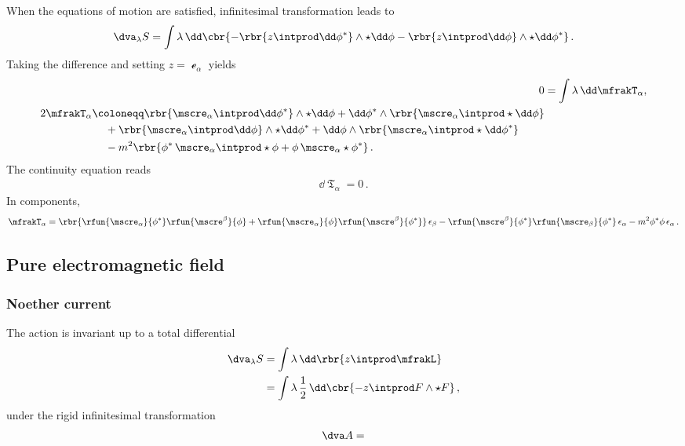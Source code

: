 \documentclass[a4paper]{article}
\begin{document}
When the equations of motion are satisfied, infinitesimal 
transformation leads to
\begin{align}
\dva_{\lambda} S = \int \lambda\,\dd\cbr{
	-\rbr{z\intprod\dd\phi^*}\wedge\star\dd\phi
	-\rbr{z\intprod\dd\phi}\wedge\star\dd\phi^*}\,.
\end{align}
Taking the difference and setting $z = \mscre_{\alpha}$ yields
\begin{align}
0 &= \int \lambda\,\dd \mfrakT_{\alpha}, \\
\begin{split}
2 \mfrakT_{\alpha} &\coloneqq
\rbr{\mscre_{\alpha}\intprod\dd\phi^*}\wedge\star\dd\phi +
\dd\phi^*\wedge\rbr{\mscre_{\alpha}\intprod\star\dd\phi}
\\
&\quad\,+
\rbr{\mscre_{\alpha}\intprod\dd\phi}\wedge\star\dd\phi^* +
\dd\phi\wedge\rbr{\mscre_{\alpha}\intprod\star\dd\phi^*}
\\
&\quad\,-
m^2\rbr{\phi^*\,\mscre_{\alpha}\intprod\star\phi +
	\phi\,\mscre_{\alpha}\star\phi^*}\,.
\end{split}
\end{align}
The continuity equation reads
\begin{align}
\dd \mfrakT_{\alpha} = 0\,.
\end{align}
In components,
\begin{align}
\mfrakT_{\alpha} =
\rbr{\rfun{\mscre_{\alpha}}{\phi^*} \rfun{\mscre^{\beta}}{\phi}+
	\rfun{\mscre_{\alpha}}{\phi} \rfun{\mscre^{\beta}}{\phi^*}}\,
		\epsilon_{\beta} - 
\rfun{\mscre^{\beta}}{\phi^*} \rfun{\mscre_{\beta}}{\phi^*}\,
	\epsilon_{\alpha}
- m^2 \phi^* \phi\, \epsilon_{\alpha}\,.
\end{align}

\subsection{Pure electromagnetic field}

\subsubsection{Noether current}
The action is invariant up to a total differential
\begin{align}
\dva_{\lambda} S &= \int \lambda\,\dd\rbr{z \intprod \mfrakL}
\nonumber \\
&= \int \lambda\,\frac{1}{2}\,\dd\cbr{
	- z\intprod F\wedge\star F }\,,
\end{align}
under the rigid infinitesimal transformation
\begin{align}
\dva A = 
\end{align}
\end{document}
